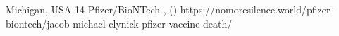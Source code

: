           {Michigan, USA}
          {14}
          {Pfizer/BioNTech}
          {, }
          {
             ()
          }
          {https://nomoresilence.world/pfizer-biontech/jacob-michael-clynick-pfizer-vaccine-death/}

